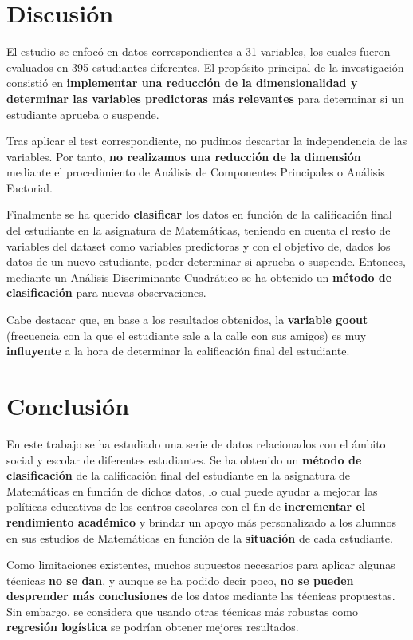 \documentclass[a4paper, 11pt]{article}
\begin{document}
\section{Discusión}

El estudio se enfocó en datos correspondientes a 31 variables, los cuales fueron evaluados en 395 estudiantes diferentes. El propósito principal de la investigación consistió en \textbf{implementar una reducción de la dimensionalidad y determinar las variables predictoras más relevantes} para determinar si un estudiante aprueba o suspende.

Tras aplicar el test correspondiente, no pudimos descartar la independencia de las variables. Por tanto, \textbf{no realizamos una reducción de la dimensión} mediante el procedimiento de Análisis de Componentes Principales o Análisis Factorial.

Finalmente se ha querido \textbf{clasificar} los datos en función de la calificación final del estudiante en la asignatura de Matemáticas, teniendo en cuenta el resto de variables del dataset como variables predictoras y con el objetivo de, dados los datos de un nuevo estudiante, poder determinar si aprueba o suspende. Entonces, mediante un Análisis Discriminante Cuadrático se ha obtenido un \textbf{método de clasificación} para nuevas observaciones.

Cabe destacar que, en base a los resultados obtenidos, la \textbf{variable goout} (frecuencia con la que el estudiante sale a la calle con sus amigos) es muy \textbf{influyente} a la hora de determinar la calificación final del estudiante.

\newpage

\section{Conclusión}

En este trabajo se ha estudiado una serie de datos relacionados con el ámbito social y escolar de diferentes estudiantes. Se ha obtenido un \textbf{método de clasificación} de la calificación final del estudiante en la asignatura de Matemáticas en función de dichos datos, lo cual puede ayudar a mejorar las políticas educativas de los centros escolares con el fin de \textbf{incrementar el rendimiento académico} y brindar un apoyo más personalizado a los alumnos en sus estudios de Matemáticas en función de la \textbf{situación} de cada estudiante.

Como limitaciones existentes, muchos supuestos necesarios para aplicar algunas técnicas \textbf{no se dan}, y aunque se ha podido decir poco, \textbf{no se pueden desprender más conclusiones} de los datos mediante las técnicas propuestas. Sin embargo, se considera que usando otras técnicas más robustas como \textbf{regresión logística} se podrían obtener mejores resultados.
\end{document}

